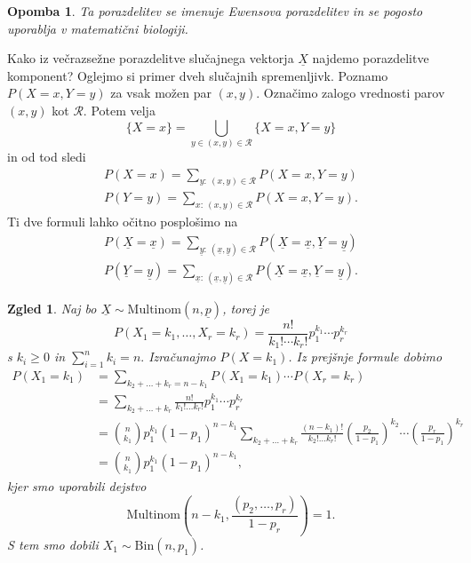 \documentclass[10pt, a4paper]{article}
\newtheorem*{opomba}{Opomba}
\newtheorem{zgled}[izr]{Zgled}
\begin{document}
\begin{opomba}
  Ta porazdelitev se imenuje Ewensova porazdelitev in se pogosto uporablja v matematični biologiji.
\end{opomba}

Kako iz večrazsežne porazdelitve slučajnega vektorja $\underline{X}$ najdemo porazdelitve komponent?
Oglejmo si primer dveh slučajnih spremenljivk. Poznamo $P(X = x, Y = y)$ za vsak možen par $(x, y)$.
Označimo zalogo vrednosti parov $(x, y)$ kot $\mathcal{R}$.
Potem velja 
$$\{X = x\} = \bigcup_{y \in (x, y) \in \mathcal{R}} \{X = x, Y = y\}$$
in od tod sledi 
\begin{gather*}
  P(X = x) = \sum_{y:\ (x, y) \in \mathcal{R}} P(X = x, Y = y)\\
  P(Y = y) = \sum_{x:\ (x, y) \in \mathcal{R}} P(X = x, Y = y).
\end{gather*}
Ti dve formuli lahko očitno posplošimo na 
\begin{gather*}
  P(\underline{X} = \underline{x}) = \sum_{\underline{y}:\ (\underline{x}, \underline{y}) \in \mathcal{R}} P(\underline{X} = \underline{x}, \underline{Y} = \underline{y})\\
  P(\underline{Y} = \underline{y}) = \sum_{\underline{x}:\ (\underline{x}, \underline{y}) \in \mathcal{R}} P(\underline{X} = \underline{x}, \underline{Y} = \underline{y}).
\end{gather*}

\begin{zgled}
  Naj bo $\underline{X} \sim \mathrm{Multinom}(n, \underline{p})$,
  torej je 
  $$P(X_1 = k_1, \dots, X_r = k_r) = \frac{n!}{k_1! \cdots k_r!} p_1^{k_1} \cdots p_r^{k_r}$$
  s $k_i \geq 0$ in $\sum_{i = 1} ^n k_i = n.$ Izračunajmo $P(X = k_1)$.
  Iz prejšnje formule dobimo 
  \begin{align*}
    P(X_1 = k_1) &= \sum_{k_2 + \dots + k_r = n - k_1} P(X_1 = k_1) \cdots P(X_r = k_r)\\
    &= \sum_{k_2 + \dots + k_r} \frac{n!}{k_1! \dots k_r!} p_1^{k_1} \cdots p_r^{k_r}\\
    &= \binom{n}{k_1} p_1^{k_1} (1 - p_1)^{n - k_1} \sum_{k_2 + \dots + k_r} \frac{(n - k_1)!}{k_2! \dots k_r!} \left(\frac{p_2}{1 - p_1}\right)^{k_2} \cdots \left(\frac{p_r}{1 - p_1}\right)^{k_r}\\
    &= \binom{n}{k_1} p_1^{k_1} (1 - p_1)^{n - k_1}, 
  \end{align*}
  kjer smo uporabili dejstvo 
  $$\mathrm{Multinom} \left(n - k_1, \frac{(p_2, \dots, p_r)}{1 - p_r}\right) = 1.$$
  S tem smo dobili $X_1 \sim \mathrm{Bin} (n, p_1)$.
\end{zgled}
\end{document}
